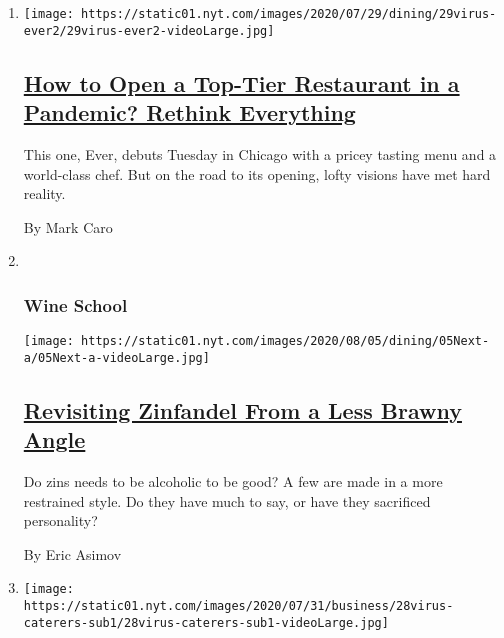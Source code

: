\begin{enumerate}
\def\labelenumi{\arabic{enumi}.}
\item
  \texttt{[image: https://static01.nyt.com/images/2020/07/29/dining/29virus-ever2/29virus-ever2-videoLarge.jpg]}

  \hypertarget{how-to-open-a-top-tier-restaurant-in-a-pandemic-rethink-everything}{%
  \subsection{\texorpdfstring{\href{/2020/07/28/dining/ever-chicago-restaurant-coronavirus.html}{How
  to Open a Top-Tier Restaurant in a Pandemic? Rethink
  Everything}}{How to Open a Top-Tier Restaurant in a Pandemic? Rethink Everything}}\label{how-to-open-a-top-tier-restaurant-in-a-pandemic-rethink-everything}}

  This one, Ever, debuts Tuesday in Chicago with a pricey tasting menu
  and a world-class chef. But on the road to its opening, lofty visions
  have met hard reality.

  By Mark Caro
\item ~
  \hypertarget{wine-school-1}{%
  \subsubsection{Wine School}\label{wine-school-1}}

  \texttt{[image: https://static01.nyt.com/images/2020/08/05/dining/05Next-a/05Next-a-videoLarge.jpg]}

  \hypertarget{revisiting-zinfandel-from-a-less-brawny-angle}{%
  \subsection{\texorpdfstring{\href{/2020/07/30/dining/drinks/wine-school-assignment-zinfandel.html}{Revisiting
  Zinfandel From a Less Brawny
  Angle}}{Revisiting Zinfandel From a Less Brawny Angle}}\label{revisiting-zinfandel-from-a-less-brawny-angle}}

  Do zins needs to be alcoholic to be good? A few are made in a more
  restrained style. Do they have much to say, or have they sacrificed
  personality?

  By Eric Asimov
\item
  \texttt{[image: https://static01.nyt.com/images/2020/07/31/business/28virus-caterers-sub1/28virus-caterers-sub1-videoLarge.jpg]}

  \hypertarget{closing-isnt-even-an-option-with-no-events-caterers-rush-to-adjust}{%
}
\end{enumerate}
